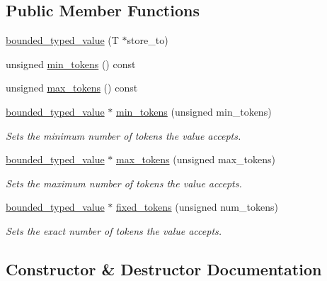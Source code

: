 \subsection*{Public Member Functions}
\begin{DoxyCompactItemize}
\item 
\hyperlink{classboost_1_1program__options_1_1bounded__typed__value_a12afa63e7f1d130c2e4be4c33f311263}{bounded\+\_\+typed\+\_\+value} (T $\ast$store\+\_\+to)
\item 
unsigned \hyperlink{classboost_1_1program__options_1_1bounded__typed__value_a67e6498d4ded608e3524ad10b2da0172}{min\+\_\+tokens} () const 
\item 
unsigned \hyperlink{classboost_1_1program__options_1_1bounded__typed__value_af086d6e78b7e7f849bd1f4842a13bb93}{max\+\_\+tokens} () const 
\item 
\hyperlink{classboost_1_1program__options_1_1bounded__typed__value}{bounded\+\_\+typed\+\_\+value} $\ast$ \hyperlink{group___utility_module_ga92bfc58add0451fb2f594e7b78ff966c}{min\+\_\+tokens} (unsigned min\+\_\+tokens)
\begin{DoxyCompactList}\small\item\em Sets the minimum number of tokens the value accepts. \end{DoxyCompactList}\item 
\hyperlink{classboost_1_1program__options_1_1bounded__typed__value}{bounded\+\_\+typed\+\_\+value} $\ast$ \hyperlink{group___utility_module_ga88b81b9c4d7c1f667594d6e1490078ff}{max\+\_\+tokens} (unsigned max\+\_\+tokens)
\begin{DoxyCompactList}\small\item\em Sets the maximum number of tokens the value accepts. \end{DoxyCompactList}\item 
\hyperlink{classboost_1_1program__options_1_1bounded__typed__value}{bounded\+\_\+typed\+\_\+value} $\ast$ \hyperlink{group___utility_module_ga1a9caf446ce6f236f70dfd6a54885478}{fixed\+\_\+tokens} (unsigned num\+\_\+tokens)
\begin{DoxyCompactList}\small\item\em Sets the exact number of tokens the value accepts. \end{DoxyCompactList}\end{DoxyCompactItemize}


\subsection{Constructor \& Destructor Documentation}
